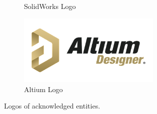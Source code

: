 \begin{figure}[hb!]
\begin{subfigure}[b]{0.38\columnwidth}
        \caption{SolidWorks Logo}
    \end{subfigure}
    \begin{subfigure}[b]{0.38\columnwidth}
        \centering
        \includegraphics[width=0.75\textwidth]{Sections/6Conclusion/images/altium_logo.png}
        \caption{Altium Logo}
    \end{subfigure}
    \caption{Logos of acknowledged entities.}
    \label{fig:logos}
\end{figure}